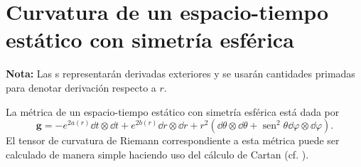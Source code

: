 \chapter{Curvatura de un espacio-tiempo estático con simetría esférica}\label{curvature}

\label{anexoA}

\noindent \small \textbf{Nota:} Las \quotes{$\dd$}s representarán derivadas exteriores y se usarán cantidades primadas para denotar derivación respecto a $r$.

\normalsize
\noindent La métrica de un espacio-tiempo estático con simetría esférica está dada por
\begin{equation}
    \bm{g}=-e^{2 a(r)} \dd{t} \otimes \dd{t}+e^{2 b(r)} \dd{r} \otimes \dd{r} +r^{2}\left(\dd{\theta} \otimes \dd{\theta}+\operatorname{sen}^{2} \theta \dd{\varphi} \otimes \dd{\varphi}\right).
\end{equation}
El tensor de curvatura de Riemann correspondiente a esta métrica puede ser calculado de manera simple haciendo uso del cálculo de Cartan (cf. \cite{Chandrasekhar1983,Straumann2013}). 

